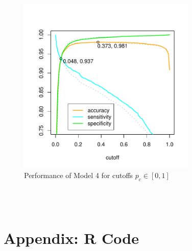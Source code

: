\documentclass[11pt, oneside]{article}
\begin{document}
\begin{figure}[h!]
\includegraphics[width = 8.5cm]{cutoffs4}
\caption{Performance of Model 4 for cutoffs $p_c \in [0,1]$}
\label{fig:cutoffs4}
\end{figure}

~\\
\pagebreak
~\\
\pagebreak
\flushleft
\section*{Appendix: R Code}
\end{document}
